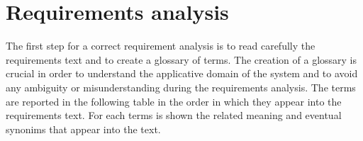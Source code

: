 \documentclass[a4paper]{article}
\begin{document}
\section{Requirements analysis }

The first step for a correct requirement analysis is to read carefully the requirements text and to create a glossary of terms. The creation of a glossary is crucial in order to understand the applicative domain of the system and to avoid any ambiguity or misunderstanding during the requirements analysis. \newline\newline
The terms are reported in the following table in the order in which they appear into the requirements text. For each terms is shown the related meaning and eventual synonims that appear into the text. \hfill \break
\end{document}
